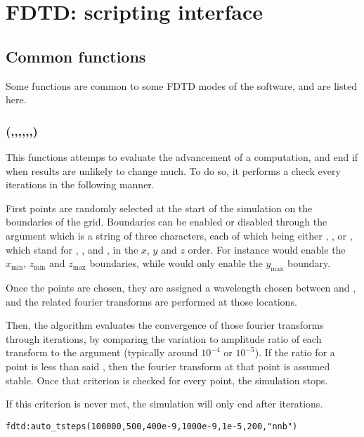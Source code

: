 \chapter{FDTD: scripting interface}

\label{chapter_fdtd}

\section{Common functions}

Some functions are common to some FDTD modes of the software, and are listed here.

\subsection[auto\_tsteps]{(,,,,,,)}

This functions attemps to evaluate the advancement of a computation, and end if when results are unlikely to change much. To do so, it performs a check every  iterations in the following manner. 

First  points are randomly selected at the start of the simulation on the boundaries of the grid. Boundaries can be enabled or disabled through the  argument which is a string of three characters, each of which being either , ,  or , which stand for , ,  and , in the $x$, $y$ and $z$ order. For instance  would enable the $x_\textrm{min}$, $z_\textrm{min}$ and $z_\textrm{max}$ boundaries, while  would only enable the $y_\textrm{max}$ boundary.

Once the points are chosen, they are assigned a wavelength chosen between  and , and the related fourier transforms are performed at those locations.

Then, the algorithm evaluates the convergence of those fourier transforms through iterations, by comparing the variation to amplitude ratio of each transform to the  argument (typically around $10^{-4}$ or $10^{-5}$). If the ratio for a point is less than said , then the fourier transform at that point is assumed stable. Once that criterion is checked for every point, the simulation stops.

If this criterion is never met, the simulation will only end after  iterations.
\begin{lstlisting}
fdtd:auto_tsteps(100000,500,400e-9,1000e-9,1e-5,200,"nnb")
\end{lstlisting}

